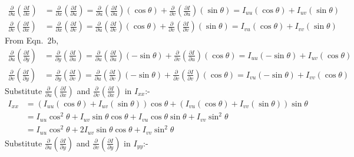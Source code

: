 \documentclass[12pt]{article}
\begin{document}
\begin{align*}
    \frac{\partial}{\partial u} \left(\frac{\partial I}{\partial x}\right) &= \frac{\partial}{\partial x} \left(\frac{\partial I}{\partial u}\right) = \frac{\partial}{\partial{u}} \left(\frac{\partial I}{\partial u}\right) (\cos \theta) + \frac{\partial}{\partial{v}} \left(\frac{\partial I}{\partial u}\right) (\sin \theta) = I_{uu} (\cos \theta) + I_{uv} (\sin \theta) \\
    \frac{\partial}{\partial v} \left(\frac{\partial I}{\partial x}\right) &= \frac{\partial}{\partial x} \left(\frac{\partial I}{\partial v}\right) = \frac{\partial}{\partial{u}} \left(\frac{\partial I}{\partial v}\right) (\cos \theta) + \frac{\partial}{\partial{v}} \left(\frac{\partial I}{\partial v}\right) (\sin \theta) = I_{vu} (\cos \theta) + I_{vv} (\sin \theta)
\end{align*}
From Eqn.\ 2b,
\begin{align*}
    \frac{\partial}{\partial u} \left(\frac{\partial I}{\partial y}\right) &= \frac{\partial}{\partial y} \left(\frac{\partial I}{\partial u}\right) = \frac{\partial}{\partial{u}} \left(\frac{\partial I}{\partial u}\right) (- \sin \theta) + \frac{\partial}{\partial{v}} \left(\frac{\partial I}{\partial u}\right) (\cos \theta) = I_{uu} (- \sin \theta) + I_{uv} (\cos \theta) \\
    \frac{\partial}{\partial v} \left(\frac{\partial I}{\partial y}\right) &= \frac{\partial}{\partial y} \left(\frac{\partial I}{\partial v}\right) = \frac{\partial}{\partial{u}} \left(\frac{\partial I}{\partial v}\right) (- \sin \theta) + \frac{\partial}{\partial{v}} \left(\frac{\partial I}{\partial v}\right) (\cos \theta) = I_{vu} (- \sin \theta) + I_{vv} (\cos \theta)
\end{align*}
Substitute $\frac{\partial}{\partial{u}} \left(\frac{\partial I}{\partial x}\right)$ and $\frac{\partial}{\partial{v}} \left(\frac{\partial I}{\partial x}\right)$ in $I_{xx}$:-
\begin{align*}
    I_{xx} &= (I_{uu} (\cos \theta) + I_{uv} (\sin \theta)) \cos \theta + (I_{vu} (\cos \theta) + I_{vv} (\sin \theta)) \sin \theta \\
    &= I_{uu} \cos^2 \theta  + I_{uv} \sin \theta \cos \theta + I_{vu} \cos \theta \sin \theta + I_{vv} \sin^2 \theta \\
    &= I_{uu} \cos^2 \theta + 2 I_{uv} \sin \theta \cos \theta + I_{vv} \sin^2 \theta
\end{align*}
Substitute $\frac{\partial}{\partial{u}} \left(\frac{\partial I}{\partial y}\right)$ and $\frac{\partial}{\partial{v}} \left(\frac{\partial I}{\partial y}\right)$ in $I_{yy}$:-
\end{document}
